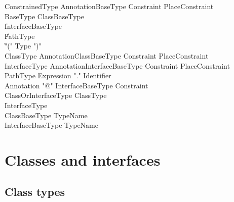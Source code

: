 {\begin{grammar}
ConstrainedType \: Annotation\star BaseType Constraint\opt
PlaceConstraint\opt \\

BaseType \: ClassBaseType \\
     \| InterfaceBaseType \\
     \| PathType \\
     \| \xcd"(" Type \xcd")" \\

ClassType \: Annotation\star ClassBaseType Constraint\opt
PlaceConstraint\opt \\
InterfaceType \: Annotation\star InterfaceBaseType Constraint\opt
PlaceConstraint\opt \\

PathType \: Expression \xcd"." Identifier \\

Annotation \: \xcd"@" InterfaceBaseType Constraint\opt \\

ClassOrInterfaceType \: ClassType \\ \| InterfaceType \\
ClassBaseType \: TypeName \\
InterfaceBaseType \: TypeName \\
\end{grammar}

% 




\section{Classes and interfaces}
\label{ReferenceTypes}

\subsection{Class types}


}
